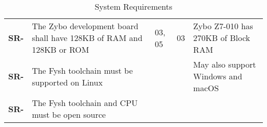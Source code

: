 \resetfyshcounter
\newcommand{\sr}[4]{
	\textbf{SR-\rc} & #1 & #2 & #3 & #4 \\
	\hline
}
\begin{table}[H]
	\begin{tabularx}{\textwidth}{| a | x | a | a | a |}
		\hline

		 &  %
		           &                           %
		           &                           %
		           &                           \\
		\hline
		\sr{The Zybo development board shall have 128KB of RAM and 128KB or ROM}%
		{03, 05}%
		{03}%
		{Zybo Z7-010 has 270KB of Block RAM} %

		\sr{The Fysh toolchain must be supported on Linux}%
		{}%
		{}%
		{May also support Windows and macOS}

		\sr{The Fysh toolchain and CPU must be open source}%
		{}%
		{}%
		{}

	\end{tabularx}
	\caption{System Requirements}
\end{table}

